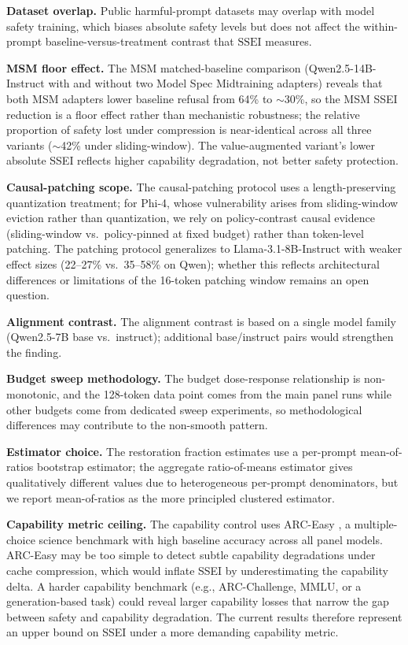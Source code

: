 \documentclass{article}
\newcommand{\ssei}{\mathrm{SSEI}}
\begin{document}
\textbf{Dataset overlap.} Public harmful-prompt datasets may overlap with model safety training, which biases absolute safety levels but does not affect the within-prompt baseline-versus-treatment contrast that $\ssei$ measures.

\textbf{MSM floor effect.} The MSM matched-baseline comparison (Qwen2.5-14B-Instruct with and without two Model Spec Midtraining adapters) reveals that both MSM adapters lower baseline refusal from 64\% to $\sim$30\%, so the MSM SSEI reduction is a floor effect rather than mechanistic robustness; the relative proportion of safety lost under compression is near-identical across all three variants ($\sim$42\% under sliding-window). The value-augmented variant's lower absolute SSEI reflects higher capability degradation, not better safety protection.

\textbf{Causal-patching scope.} The causal-patching protocol uses a length-preserving quantization treatment; for Phi-4, whose vulnerability arises from sliding-window eviction rather than quantization, we rely on policy-contrast causal evidence (sliding-window vs.\ policy-pinned at fixed budget) rather than token-level patching. The patching protocol generalizes to Llama-3.1-8B-Instruct with weaker effect sizes (22--27\% vs.\ 35--58\% on Qwen); whether this reflects architectural differences or limitations of the 16-token patching window remains an open question.

\textbf{Alignment contrast.} The alignment contrast is based on a single model family (Qwen2.5-7B base vs.\ instruct); additional base/instruct pairs would strengthen the finding.

\textbf{Budget sweep methodology.} The budget dose-response relationship is non-monotonic, and the 128-token data point comes from the main panel runs while other budgets come from dedicated sweep experiments, so methodological differences may contribute to the non-smooth pattern.

\textbf{Estimator choice.} The restoration fraction estimates use a per-prompt mean-of-ratios bootstrap estimator; the aggregate ratio-of-means estimator gives qualitatively different values due to heterogeneous per-prompt denominators, but we report mean-of-ratios as the more principled clustered estimator.

\textbf{Capability metric ceiling.} The capability control uses ARC-Easy \citep{clark2018arc}, a multiple-choice science benchmark with high baseline accuracy across all panel models. ARC-Easy may be too simple to detect subtle capability degradations under cache compression, which would inflate SSEI by underestimating the capability delta. A harder capability benchmark (e.g., ARC-Challenge, MMLU, or a generation-based task) could reveal larger capability losses that narrow the gap between safety and capability degradation. The current results therefore represent an upper bound on SSEI under a more demanding capability metric.
\end{document}
